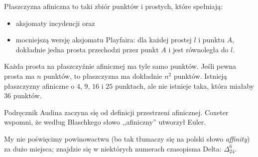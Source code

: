 \begin{proposition}
    Płaszczyzna afiniczna to taki zbiór punktów i prostych, które spełniają: 
    \begin{itemize}
        \item aksjomaty incydencji oraz
        \item mocniejszą wersję aksjomatu Playfaira: dla każdej prostej $l$ i punktu $A$, dokładnie jedna prosta przechodzi przez punkt $A$ i jest równoległa do $l$.
    \end{itemize}
    Każda prosta na płaszczyźnie afinicznej ma tyle samo punktów.
    Jeśli pewna prosta ma $n$ punktów, to płaszczyzna ma dokładnie $n^2$ punktów.
    Istnieją płaszczyzny afiniczne o $4$, $9$, $16$ i $25$ punktach, ale nie istnieje taka, która miałaby $36$ punktów.
\end{proposition} %

Podręcznik Audina \cite[s. 7]{audin_2003} zaczyna się od definicji przestrzeni afinicznej.
Coxeter \cite[s. 209]{coxeter_1967} wspomni, że według Blaschkego słowo ,,afiniczny'' utworzył Euler.

My nie poświęcimy powinowactwu (bo tak tłumaczy się na polski słowo \emph{affinity}) za dużo miejsca; znajdzie się w niektórych numerach czasopisma Delta: $\Delta_{24}^6$.

%
